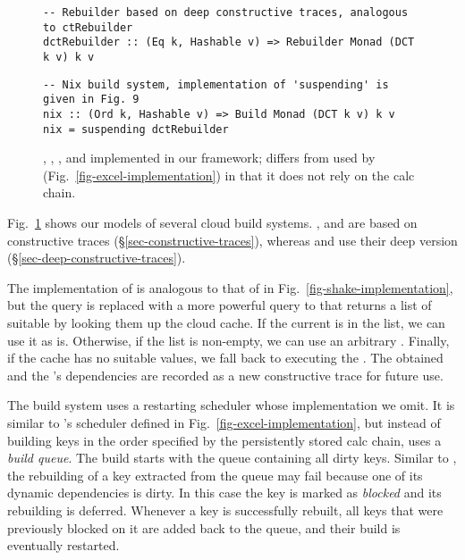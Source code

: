 \begin{figure}
\vspace{0mm}
\begin{verbatim}
-- Rebuilder based on deep constructive traces, analogous to ctRebuilder
dctRebuilder :: (Eq k, Hashable v) => Rebuilder Monad (DCT k v) k v
\end{verbatim}
\vspace{0mm}
\begin{verbatim}
-- Nix build system, implementation of 'suspending' is given in Fig. 9
nix :: (Ord k, Hashable v) => Build Monad (DCT k v) k v
nix = suspending dctRebuilder
\end{verbatim}
\vspace{-2mm}
\caption{\Bazel, \Cloud \Shake, \CloudBuild, \Buck and \Nix implemented in
our framework;  differs from  used by \Excel
(Fig.~\ref{fig-excel-implementation}) in that it does not rely on the calc
chain.}
\label{fig-cloud-implementations}
\vspace{-4mm}
\end{figure}

Fig.~\ref{fig-cloud-implementations} shows our models of several cloud build
systems. \Bazel, \CloudBuild and \Cloud \Shake are based on constructive traces
(\S\ref{sec-constructive-traces}), whereas \Buck and \Nix use their deep
version (\S\ref{sec-deep-constructive-traces}).

The implementation of  is analogous to that of 
in Fig.~\ref{fig-shake-implementation}, but the  query is replaced
with a more powerful query to  that returns a list of suitable
 by looking them up the cloud cache. If the current 
is in the list, we can use it as is. Otherwise, if the list is non-empty, we can
use an arbitrary . Finally, if the cache has no suitable values,
we fall back to executing the . The obtained  and the
's dependencies are recorded as a new constructive trace for future
use.

The \Bazel build system uses a restarting scheduler whose implementation we
omit. It is similar to \Excel's  scheduler defined in
Fig.~\ref{fig-excel-implementation}, but instead of building keys in the order
specified by the persistently stored calc chain, \Bazel uses a \emph{build
queue}. The build starts with the queue containing all dirty keys. Similar to
\Excel, the rebuilding of a key extracted from the queue may fail because one of
its dynamic dependencies is dirty. In this case the key is marked as
\emph{blocked} and its rebuilding is deferred. Whenever a key is successfully
rebuilt, all keys that were previously blocked on it are added back to the
queue, and their build is eventually restarted.

